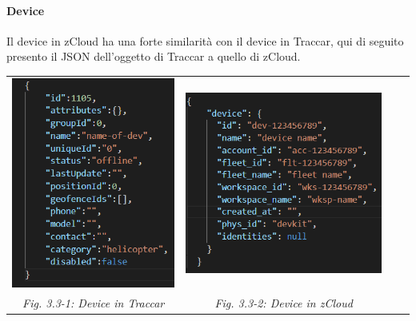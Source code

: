 \documentclass[a4paper,titlepage,12pt]{report}
\begin{document}
{\paragraph{
Device}
Il device in zCloud ha una forte similarità con il device in Traccar, qui di seguito presento il JSON dell'oggetto di Traccar a quello di zCloud.\\



\begin{center}

\begin{tabular}{c c c c}

    \includegraphics[scale=0.8]{images/traccDev.png}


 &  
\includegraphics[scale=0.6]{images/zClDev.png} \\
\textit{Fig. 3.3-1: Device in Traccar} &  \textit{Fig. 3.3-2: Device in zCloud}
\end{tabular}
\end{center}\par\medskip


}
\end{document}
